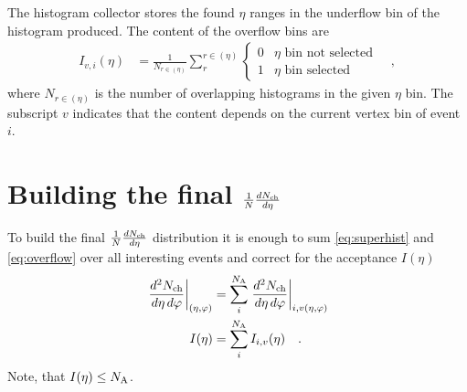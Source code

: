 \documentclass[11pt]{article}
\newcommand{\mult}[1][]{\ensuremath N_{\text{ch}#1}}
\newcommand{\dndetadphi}[1][]{{\ensuremath%
    \ifx|#1|\else\left.\fi%
    \frac{d^2\mult{}}{d\eta\,d\varphi}%
    \ifx|#1|\else\right|_{#1}\fi%
}}
\newcommand{\dndeta}[1][]{{\ensuremath%
    \ifx|#1|\else\left.\fi%
    \frac{1}{N}\frac{d\mult{}}{d\eta}%
    \ifx|#1|\else\right|_{#1}\fi%
}}
\newcommand{\N}[2]{{\ensuremath N_{#1#2}}}
\newcommand{\NA}{\N{\text{A}}{}}
\newcommand{\etaphi}{\ensuremath(\eta,\varphi)}
\begin{document}
The histogram collector stores the found $\eta$ ranges in the
underflow bin of the histogram produced.  The content of the overflow
bins are 
\begin{align}
  \label{eq:overflow}
  I_{v,i}(\eta) &= 
  \frac{1}{N_{r\in(\eta)}}
  \sum_{r}^{r\in(\eta)} \left\{\begin{array}{cl} 
      0 & \eta \text{\ bin not selected}\\ 
      1 & \eta \text{\ bin selected}
      \end{array}\right.\quad,
\end{align}
where $N_{r\in(\eta)}$ is the number of overlapping histograms in the
given $\eta$ bin.  The subscript $v$ indicates that the content
depends on the current vertex bin of event $i$.

\section{Building the final $\dndeta$}
\label{sec:ana_aod}

To build the final $\dndeta$ distribution it is enough to sum
\eqref{eq:superhist} and \eqref{eq:overflow} over all interesting
events and correct for the acceptance $I(\eta)$ 
\begin{align}
  \dndetadphi[\etaphi] &= \sum_i^{\NA}\dndetadphi[i,v\etaphi]\\ 
  I(\eta) &= \sum_i^{\NA}I_{i,v}(\eta)\quad.
\end{align}
Note, that $I(\eta)\le\NA$.  
\end{document}
